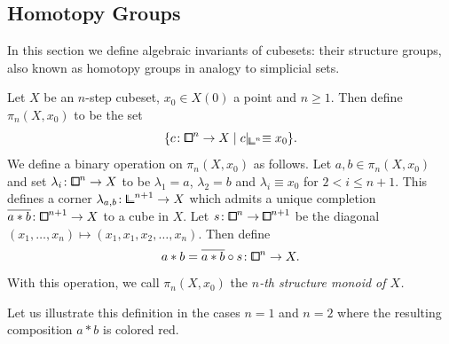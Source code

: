 \subsection{Homotopy Groups}\label{ssec:structure-group}

In this section we define algebraic invariants of cubesets: their structure groups,
also known as homotopy groups in analogy to simplicial sets.

\begin{definition}\label{def:structure-group}
Let $X$ be an $n$-step cubeset, $x_0\in X(0)$ a point and $n\geq 1$.
Then define $\pi_n(X,x_0)$ to be the set
\[
    \{ c\colon{\bbox}^n\to X \mid c\lvert_{{\bbcor}^n} \equiv x_0 \}.
\]
We define a binary operation on $\pi_n(X,x_0)$ as follows.
Let $a,b\in\pi_n(X,x_0)$ and set $\lambda_i\colon{\bbox}^n\to X$ to be $\lambda_1 = a$, $\lambda_2 = b$ and $\lambda_i \equiv x_0$ for $2<i\le n+1$.
This defines a corner $\lambda_{a,b}\colon{\bbcor}^{n+1}\to X$ which admits a unique completion $\overline{a*b}\colon{\bbox}^{n+1}\to X$ to a cube in $X$.
Let $s\colon{\bbox}^n\to{\bbox}^{n+1}$ be the diagonal $(x_1,\ldots,x_n)\mapsto (x_1,x_1,x_2,\ldots,x_n)$.
Then define
\[
    a * b = \overline{a*b}\circ s \colon {\bbox}^n\to X.
\]
With this operation, we call $\pi_n(X,x_0)$ the \emph{$n$-th structure monoid of $X$.}
\end{definition}


Let us illustrate this definition in the cases $n=1$ and $n=2$
where the resulting composition $a*b$ is colored red.
\begin{center}
\end{center}



